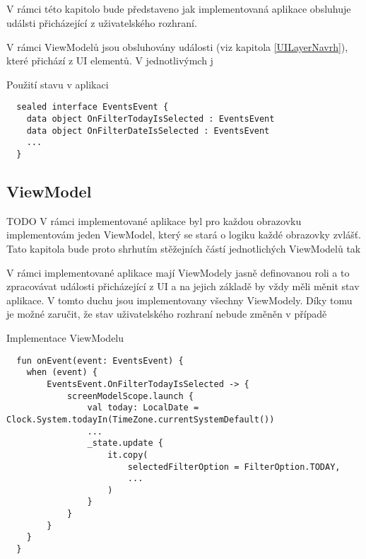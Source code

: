 \subsection{} \label{eventHandlingImpl}
V rámci této kapitolo bude představeno jak implementovaná aplikace obsluhuje událsti přicházející z uživatelského rozhraní.


V rámci ViewModelů jsou obsluhovány události (viz kapitola \ref{UILayerNavrh}), které přichází z UI elementů. V jednotlivýmch j


\begin{listing}
\caption{Použití stavu v aplikaci}\label{lst:StateImpl}
\begin{verbatim}
  sealed interface EventsEvent {
    data object OnFilterTodayIsSelected : EventsEvent
    data object OnFilterDateIsSelected : EventsEvent
    ...
  }
\end{verbatim}
\end{listing}

\subsection{ViewModel} \label{ViewModelImpl}
TODO %
V rámci implementované aplikace byl pro každou obrazovku implementovám jeden ViewModel, který se stará o logiku každé obrazovky zvlášť. Tato kapitola 
bude proto shrhutím stěžejních částí jednotlichých ViewModelů tak 


V rámci implementované aplikace mají ViewModely jasně definovanou roli a to zpracovávat události přicházející z UI a na jejich základě by vždy měli
měnit stav aplikace. V tomto duchu jsou implementovany všechny ViewModely. Díky tomu je možné zaručit, že stav uživatelského rozhraní  nebude změněn
v případě 
\begin{listing}
\caption{Implementace ViewModelu}\label{lst:ViewModelImpl}
\begin{verbatim}
  fun onEvent(event: EventsEvent) {
    when (event) {
        EventsEvent.OnFilterTodayIsSelected -> {
            screenModelScope.launch {
                val today: LocalDate = Clock.System.todayIn(TimeZone.currentSystemDefault())
                ...
                _state.update {
                    it.copy(
                        selectedFilterOption = FilterOption.TODAY,
                        ...
                    )
                }
            }
        }
    }
  }
\end{verbatim}
\end{listing}


